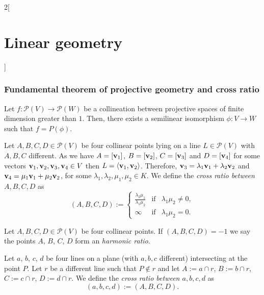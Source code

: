 \documentclass[../../../main.tex]{subfiles}
\begin{document}
\begin{multicols}{2}[\section{Linear geometry}]
    \subsubsection*{Fundamental theorem of projective geometry and cross ratio}
    \begin{theorem}
        Let $f:\mathcal{P}(V)\rightarrow \mathcal{P}(W)$ be a collineation between projective spaces of finite dimension greater than $1$. Then, there exists a semilinear isomorphism $\phi:V\rightarrow W$ such that $f=P(\phi)$.
    \end{theorem}
    \begin{definition}
        Let $A,B,C,D\in\mathcal{P}(V)$ be four collinear points lying on a line $L\in\mathcal{P}(V)$ with $A,B,C$ different. As we have $A=[\boldsymbol{\mathrm{v}}_1]$, $B=[\boldsymbol{\mathrm{v}}_2]$, $C=[\boldsymbol{\mathrm{v}}_3]$ and $D=[\boldsymbol{\mathrm{v}}_4]$ for some vectors $\boldsymbol{\mathrm{v}}_1,\boldsymbol{\mathrm{v}}_2,\boldsymbol{\mathrm{v}}_3,\boldsymbol{\mathrm{v}}_4\in V$ then $L=\langle \boldsymbol{\mathrm{v}}_1,\boldsymbol{\mathrm{v}}_2\rangle$. Therefore, $\boldsymbol{\mathrm{v}}_3=\lambda_1\boldsymbol{\mathrm{v}}_1+\lambda_2\boldsymbol{\mathrm{v}}_2$ and $\boldsymbol{\mathrm{v}}_4=\mu_1\boldsymbol{\mathrm{v}}_1+\mu_2\boldsymbol{\mathrm{v}}_2$, for some $\lambda_1,\lambda_2,\mu_1,\mu_2\in K$. We define the \textit{cross ratio between $A,B,C,D$} as $$(A,B,C,D):=\left\{
            \begin{array}{ccc}
                \displaystyle\frac{\lambda_2\mu_1}{\lambda_1\mu_2} & \text{if} & \lambda_1\mu_2\ne0, \\
                \infty                                             & \text{if} & \lambda_1\mu_2=0.
            \end{array}\right.$$
    \end{definition}
    \begin{definition}
        Let $A,B,C,D\in\mathcal{P}(V)$ be four collinear points. If $(A,B,C,D)=-1$ we say the points $A$, $B$, $C$, $D$ form an \textit{harmonic ratio}.
    \end{definition}
    \begin{definition}
        Let $a$, $b$, $c$, $d$ be four lines on a plane (with $a,b,c$ different) intersecting at the point $P$. Let $r$ be a different line such that $P\notin r$ and let $A:=a\cap r$, $B:=b\cap r$, $C:=c\cap r$, $D:=d\cap r$. We define the \textit{cross ratio between $a,b,c,d$} as $$(a,b,c,d):=(A,B,C,D).$$
    \end{definition}
    \begin{definition}

\end{definition}
\end{multicols}
\end{document}
